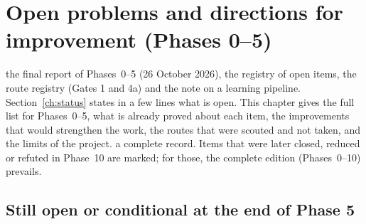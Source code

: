 \section{Open problems and directions for improvement (Phases 0--5)}\label{ch:openimprove}
\sectionbrief
{the final report of Phases~0--5 (26 October 2026), the registry of open items, the route registry (Gates 1 and 4a) and the note on a learning pipeline.}
{Section~\ref{ch:status} states in a few lines what is open. This chapter gives the full list for Phases~0--5, what is already proved about each item, the improvements that would strengthen the work, the routes that were scouted and not taken, and the limits of the project.}
{a complete record. Items that were later closed, reduced or refuted in Phase~10 are marked; for those, the complete edition (Phases~0--10) prevails.}

\subsection{Still open or conditional at the end of Phase 5}

